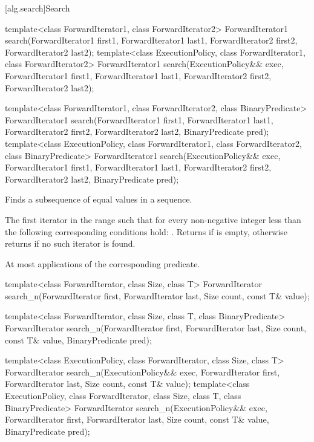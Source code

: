 [alg.search]{Search}

%
\begin{itemdecl}
template<class ForwardIterator1, class ForwardIterator2>
  ForwardIterator1
    search(ForwardIterator1 first1, ForwardIterator1 last1,
           ForwardIterator2 first2, ForwardIterator2 last2);
template<class ExecutionPolicy, class ForwardIterator1, class ForwardIterator2>
  ForwardIterator1
    search(ExecutionPolicy&& exec,
           ForwardIterator1 first1, ForwardIterator1 last1,
           ForwardIterator2 first2, ForwardIterator2 last2);

template<class ForwardIterator1, class ForwardIterator2,
         class BinaryPredicate>
  ForwardIterator1
    search(ForwardIterator1 first1, ForwardIterator1 last1,
           ForwardIterator2 first2, ForwardIterator2 last2,
           BinaryPredicate pred);
template<class ExecutionPolicy, class ForwardIterator1, class ForwardIterator2,
         class BinaryPredicate>
  ForwardIterator1
    search(ExecutionPolicy&& exec,
           ForwardIterator1 first1, ForwardIterator1 last1,
           ForwardIterator2 first2, ForwardIterator2 last2,
           BinaryPredicate pred);
\end{itemdecl}

\begin{itemdescr}
\pnum
\effects
Finds a subsequence of equal values in a sequence.

\pnum
\returns
The first iterator
in the range 
such that for every non-negative integer
less than
the following corresponding conditions hold:
.
Returns 
if  is empty,
otherwise returns 
if no such iterator is found.

\pnum
\complexity
At most
applications of the corresponding predicate.
\end{itemdescr}

%
\begin{itemdecl}
template<class ForwardIterator, class Size, class T>
  ForwardIterator
    search_n(ForwardIterator first, ForwardIterator last, Size count,
             const T& value);

template<class ForwardIterator, class Size, class T,
         class BinaryPredicate>
  ForwardIterator
    search_n(ForwardIterator first, ForwardIterator last, Size count,
             const T& value, BinaryPredicate pred);

template<class ExecutionPolicy, class ForwardIterator, class Size, class T>
  ForwardIterator
    search_n(ExecutionPolicy&& exec,
             ForwardIterator first, ForwardIterator last,
             Size count, const T& value);
template<class ExecutionPolicy, class ForwardIterator, class Size, class T,
         class BinaryPredicate>
  ForwardIterator
    search_n(ExecutionPolicy&& exec,
             ForwardIterator first, ForwardIterator last,
             Size count, const T& value,
             BinaryPredicate pred);
\end{itemdecl}

